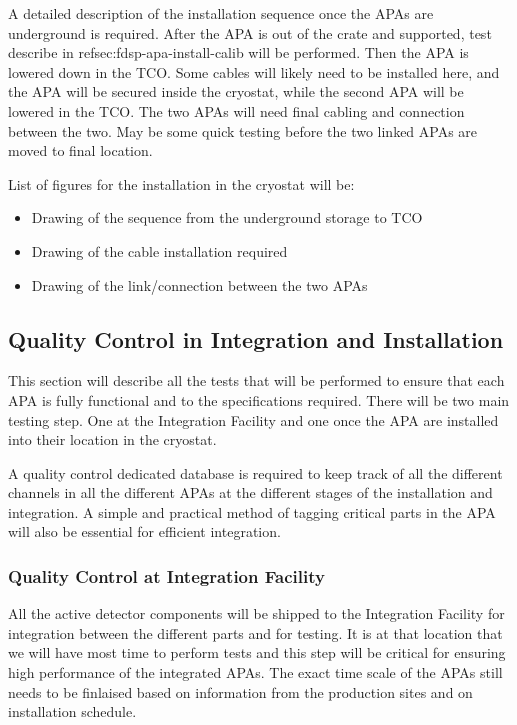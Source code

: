 A detailed description of the installation sequence once the APAs are underground is required. After the APA is out of the crate and supported, test describe in ref{sec:fdsp-apa-install-calib} will be performed. Then the APA is lowered down in the TCO. Some cables will likely need to be installed here, and the APA will be secured inside the cryostat, while the second APA will be lowered in the TCO. The two APAs will need final cabling and connection between the two. May be some quick testing before the two linked APAs are moved to final location.

List of figures for the installation in the cryostat will be:
\begin{itemize}
\item{Drawing of the sequence from the underground storage to TCO}
\item{Drawing of the cable installation required}
\item{Drawing of the link/connection between the two APAs}
\end{itemize}

\subsection{Quality Control in Integration and Installation}
\label{sec:fdsp-apa-install-calib}

This section will describe all the tests that will be performed to ensure that each APA is fully functional and to the specifications required. There will be two main testing step. One at the Integration Facility and one once the APA are installed into their location in the cryostat.

A quality control dedicated database is required to keep track of all the different channels in all the different APAs at the different stages of the installation and integration. A simple and practical method of tagging critical parts in the APA will also be essential for efficient integration.


\subsubsection{Quality Control at Integration Facility}

All the active detector components will be shipped to the Integration Facility for integration between the different parts and for testing. It is at that location that we will have most time to perform tests and this step will be critical for ensuring high performance of the integrated APAs. The exact time scale of the APAs still needs to be finlaised based on information from the production sites and on installation schedule.

